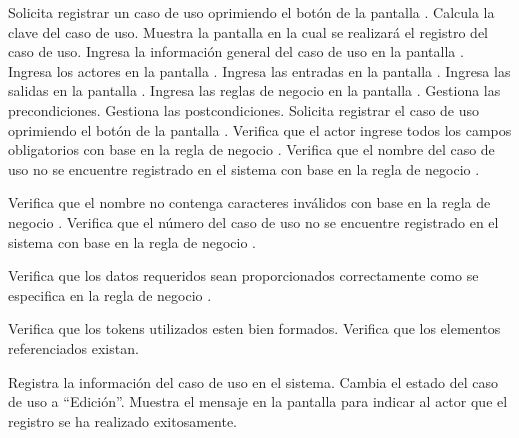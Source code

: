 \begin{UCtrayectoria}
    \UCpaso[\UCactor] Solicita registrar un caso de uso oprimiendo el botón  de la pantalla .
    \UCpaso[\UCsist] Calcula la clave del caso de uso.
    \UCpaso[\UCsist] Muestra la pantalla  en la cual se realizará el registro del caso de uso. 
    \UCpaso[\UCactor] Ingresa la información general del caso de uso en la pantalla . \label{cu5.1:ingresaDatos}
    \UCpaso[\UCactor] Ingresa los actores en la pantalla .  \label{cu5.1:ingresaActores}
    \UCpaso[\UCactor] Ingresa las entradas en la pantalla .   \label{cu5.1:ingresaEntradas}
    \UCpaso[\UCactor] Ingresa las salidas en la pantalla .    \label{cu5.1:ingresaSalidas}
    \UCpaso[\UCactor] Ingresa las reglas de negocio en la pantalla .  \label{cu5.1:ingresaReglasNegocio}
    \UCpaso[\UCactor] Gestiona las precondiciones.\label{cu5.1:ingresaPrecond}
    \UCpaso[\UCactor] Gestiona las postcondiciones.\label{cu5.1:ingresaPostcond}
    \UCpaso[\UCactor] Solicita registrar el caso de uso oprimiendo el botón  de la pantalla . 
    \UCpaso[\UCsist] Verifica que el actor ingrese todos los campos obligatorios con base en la regla de negocio  . 
    \UCpaso[\UCsist] Verifica que el nombre del caso de uso no se encuentre registrado en el sistema con base en la regla de negocio  . 
    
    \UCpaso[\UCsist] Verifica que el nombre no contenga caracteres inválidos con base en la regla de negocio . 
    \UCpaso[\UCsist] Verifica que el número del caso de uso no se encuentre registrado en el sistema con base en la regla de negocio  . 
    
    \UCpaso[\UCsist] Verifica que los datos requeridos sean proporcionados correctamente como se especifica en la regla de negocio .  
    
    \UCpaso[\UCsist] Verifica que los tokens utilizados esten bien formados. 
    \UCpaso[\UCsist] Verifica que los elementos referenciados existan. 
    
    \UCpaso[\UCsist] Registra la información del caso de uso en el sistema.
    \UCpaso[\UCsist] Cambia el estado del caso de uso a ``Edición''.
    \UCpaso[\UCsist] Muestra el mensaje  en la pantalla  
    para indicar al actor que el registro se ha realizado exitosamente.
 \end{UCtrayectoria}
 
